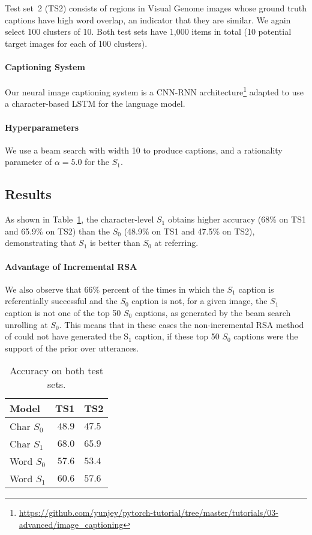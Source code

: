 \documentclass[11pt,a4paper]{article}
\begin{document}
Test set~2 (TS2) consists of regions in Visual Genome images whose ground truth captions have high word overlap, an indicator that
they are similar. We again select 100 clusters of 10. Both test sets have 1,000 items in total (10 potential target images for each of 100 clusters).

\paragraph{Captioning System} Our neural image captioning system is a CNN-RNN architecture\footnote{\url{https://github.com/yunjey/pytorch-tutorial/tree/master/tutorials/03-advanced/image_captioning}} adapted to use a character-based LSTM for the language model.

\paragraph{Hyperparameters} We use a beam search with width 10 to produce captions, and a rationality parameter of $\alpha=5.0$ for the $S_1$. 




\subsection{Results} \label{section:5}

As shown in Table~\ref{fig3}, the character-level $S_1$ obtains higher accuracy (68\% on TS1 and 65.9\% on TS2) than the $S_0$ (48.9\% on TS1 and 47.5\% on TS2), demonstrating that $S_1$ is better than $S_0$ at referring. 

\paragraph{Advantage of Incremental RSA}
We also observe that 66\% percent of the times in which the $S_1$ caption is referentially successful and the $S_0$ caption is not, for a given image, the $S_1$ caption is not one of the top 50 $S_0$ captions, as generated by the beam search unrolling at $S_0$. This means that in these cases the non-incremental RSA method of  could not have generated the S$_1$ caption, if these top 50 $S_0$ captions were the support of the prior over utterances. 


\begin{table}[t!]
\begin{center}
\setlength{\tabcolsep}{12pt}
\begin{tabular}{l r l}
\toprule 
\bf Model & \bf TS1 & \bf TS2 \\ 
\midrule
Char $S_0$ & $48.9$   & $47.5$ \\
Char $S_1$ & $\mathbf{68.0}$ & $\mathbf{65.9}$ \\
Word $S_0$ & $57.6$   & $53.4$ \\
Word $S_1$ & $60.6$   &  $57.6$ \\
\bottomrule
\end{tabular}
\end{center}
\caption{\label{fig3} Accuracy on both test sets.} %
\end{table}
\end{document}

